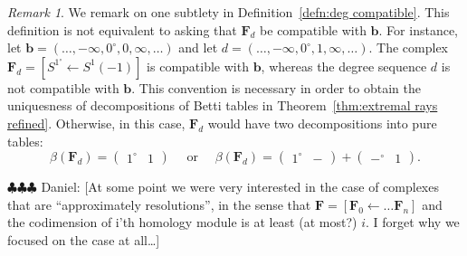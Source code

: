 \documentclass[12pt]{amsart}
\theoremstyle{definition}
\theoremstyle{remark}
\newtheorem{remark}[lemma]{Remark}
\newcommand{\bb}{\mathbf{b}}
\newcommand{\FF}{\mathbf{F}}
\newcommand{\daniel}[1]{{\color{green} \sf $\clubsuit\clubsuit\clubsuit$ Daniel: [#1]}}
\begin{document}
\begin{remark}
We remark on one subtlety in Definition~\ref{defn:deg compatible}.
This definition is not equivalent to asking that $\FF_d$ be compatible with $\bb$. 
For instance, let $\bb=(\dots, -\infty,0^\circ,0,\infty,\dots)$ and let $d=(\dots, -\infty,0^\circ ,1,\infty,\dots)$.  The complex $\FF_d=\left[ S^{1^\circ}\gets S^1(-1)\right]$ is compatible with $\bb$, whereas the degree sequence $d$ is not compatible with $\bb$.
 This convention is necessary in order to obtain the uniquesness of decompositions of Betti tables in Theorem~\ref{thm:extremal rays refined}.  Otherwise, in this case, $\FF_d$ would have two decompositions into pure tables:
\[
\beta(\FF_d)=\begin{pmatrix}
1^\circ & 1
\end{pmatrix}
\quad \text{ or } \quad
\beta(\FF_d)=
\begin{pmatrix}
1^\circ & -
\end{pmatrix}
+
\begin{pmatrix}
-^\circ & 1
\end{pmatrix}.
\]
\end{remark}



\daniel{At some point we were very interested in the case of complexes that are ``approximately resolutions'', in the sense that $\FF=[\FF_0\gets \dots \FF_n]$ and the codimension of i'th homology module is at least (at most?) $i$.   I forget why we focused on the case at all\dots}
\end{document}
